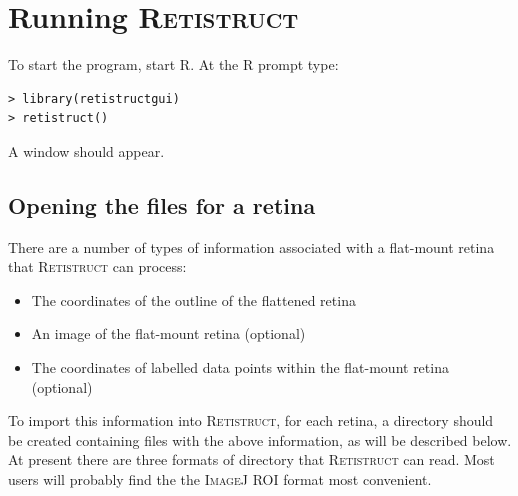 \documentclass{article}
\begin{document}



\section{Running \textsc{Retistruct}}
\label{manual:sec:running}

To start the program, start \textsc{R}. At the \textsc{R} prompt type:

\begin{verbatim}
> library(retistructgui)
> retistruct()
\end{verbatim}
A window should appear.

\subsection{Opening the files for a retina}
\label{manual:sec:opening-files-retina}

There are a number of types of information associated with a
flat-mount retina that \textsc{Retistruct} can process:
\begin{itemize}
\item The coordinates of the outline of the flattened retina
\item An image of the flat-mount retina (optional)
\item The coordinates of labelled data points within the flat-mount
  retina (optional)
\end{itemize}
To import this information into \textsc{Retistruct}, for each retina,
a directory should be created containing files with the above
information, as will be described below.  At present there are three
formats of directory that \textsc{Retistruct} can read.  Most users
will probably find the the \textsc{ImageJ} ROI format most convenient.
\end{document}
